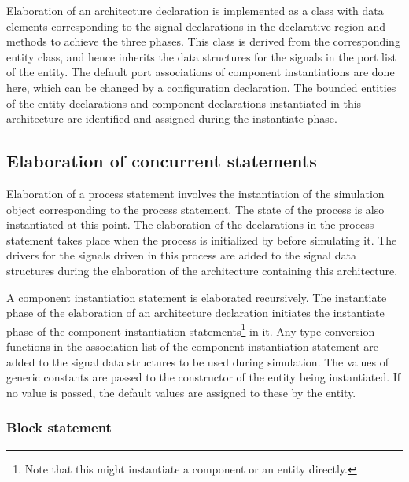 \documentclass[11pt]{article}
\begin{document}
Elaboration of an architecture declaration is implemented as a class
with data elements corresponding to the signal declarations in the
declarative region and methods to achieve the three phases.  This
class is derived from the corresponding entity class, and hence
inherits the data structures for the signals in the port list of the
entity.  The default port associations of component instantiations are
done here, which can be changed by a configuration declaration.  The
bounded entities of the entity declarations and component declarations
instantiated in this architecture are identified and assigned during
the instantiate phase.


\subsection{Elaboration of concurrent statements}

Elaboration of a process statement involves the instantiation of the
simulation object corresponding to the process statement.  The state
of the process is also instantiated at this point.  The elaboration of
the declarations in the process statement takes place when the process
is initialized by \warped\/ before simulating it.  The drivers for the
signals driven in this process are added to the signal data structures
during the elaboration of the architecture containing this
architecture.

A component instantiation statement is elaborated recursively.  The
instantiate phase of the elaboration of an architecture declaration
initiates the instantiate phase of the component instantiation
statements\footnote{Note that this might instantiate a component or an
entity directly.} in it.  Any type conversion functions in the
association list of the component instantiation statement are added to
the signal data structures to be used during simulation.  The values
of generic constants are passed to the constructor of the entity being
instantiated.  If no value is passed, the default values are assigned
to these by the entity.

\subsubsection{Block statement}
\label{sec:elab_block}
\end{document}
